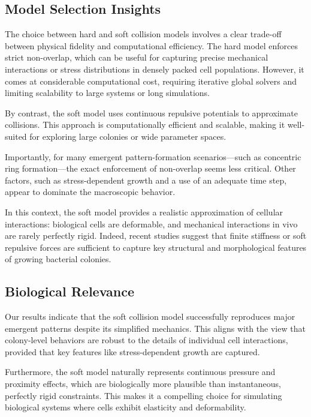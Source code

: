 \documentclass[conference]{IEEEtran}
\begin{document}
\subsection{Model Selection Insights}

The choice between hard and soft collision models involves a clear trade-off between physical fidelity and computational efficiency.
The hard model enforces strict non-overlap, which can be useful for capturing precise mechanical interactions or stress distributions in densely packed cell populations. However, it comes at considerable computational cost, requiring iterative global solvers and limiting scalability to large systems or long simulations.

By contrast, the soft model uses continuous repulsive potentials to approximate collisions. This approach is computationally efficient and scalable, making it well-suited for exploring large colonies or wide parameter spaces.

Importantly, for many emergent pattern-formation scenarios—such as concentric ring formation—the exact enforcement of non-overlap seems less critical. Other factors, such as stress-dependent growth and a use of an adequate time step, appear to dominate the macroscopic behavior.

In this context, the soft model provides a realistic approximation of cellular interactions: biological cells are deformable, and mechanical interactions in vivo are rarely perfectly rigid. Indeed, recent studies \cite{Khan_2024, Ghosh2015, SantosDiaz2025} suggest that finite stiffness or soft repulsive forces are sufficient to capture key structural and morphological features of growing bacterial colonies.

\subsection{Biological Relevance}

Our results indicate that the soft collision model successfully reproduces major emergent patterns despite its simplified mechanics. This aligns with the view that colony-level behaviors are robust to the details of individual cell interactions, provided that key features like stress-dependent growth are captured.

Furthermore, the soft model naturally represents continuous pressure and proximity effects, which are biologically more plausible than instantaneous, perfectly rigid constraints. This makes it a compelling choice for simulating biological systems where cells exhibit elasticity and deformability.
\end{document}
